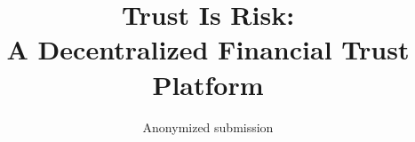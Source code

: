 \title{Trust Is Risk: \\ A Decentralized Financial Trust Platform}
\author{Anonymized submission}
\maketitle
